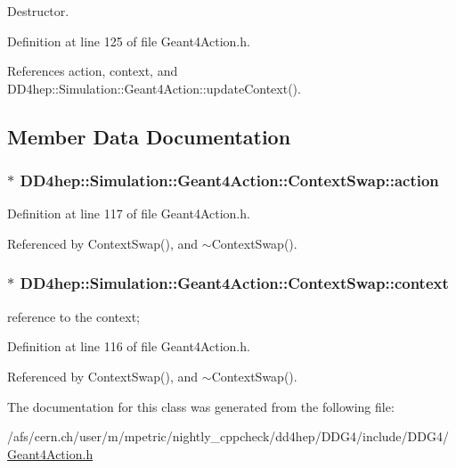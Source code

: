 Destructor. 

Definition at line 125 of file Geant4Action.h.

References action, context, and DD4hep::Simulation::Geant4Action::updateContext().

\subsection{Member Data Documentation}
\hypertarget{class_d_d4hep_1_1_simulation_1_1_geant4_action_1_1_context_swap_adbbfc954d09ad3d8b807bae2612ef23e}{
\subsubsection[{action}]{$\ast$ {\bf DD4hep::Simulation::Geant4Action::ContextSwap::action}}}
\label{class_d_d4hep_1_1_simulation_1_1_geant4_action_1_1_context_swap_adbbfc954d09ad3d8b807bae2612ef23e}


Definition at line 117 of file Geant4Action.h.

Referenced by ContextSwap(), and $\sim$ContextSwap().\hypertarget{class_d_d4hep_1_1_simulation_1_1_geant4_action_1_1_context_swap_aacd9a019417cad92349a8cd6597941c4}{
\subsubsection[{context}]{$\ast$ {\bf DD4hep::Simulation::Geant4Action::ContextSwap::context}}}
\label{class_d_d4hep_1_1_simulation_1_1_geant4_action_1_1_context_swap_aacd9a019417cad92349a8cd6597941c4}


reference to the context; 

Definition at line 116 of file Geant4Action.h.

Referenced by ContextSwap(), and $\sim$ContextSwap().

The documentation for this class was generated from the following file:\begin{DoxyCompactItemize}
\item 
/afs/cern.ch/user/m/mpetric/nightly\_\-cppcheck/dd4hep/DDG4/include/DDG4/\hyperlink{_geant4_action_8h}{Geant4Action.h}\end{DoxyCompactItemize}
